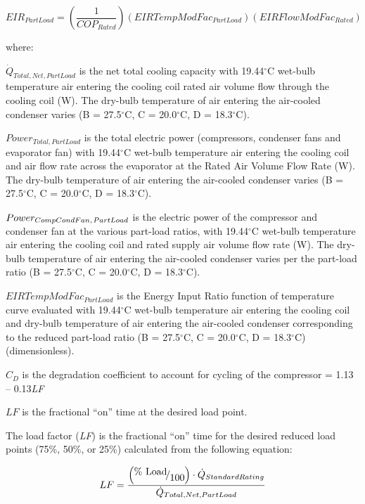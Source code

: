 \begin{equation}
EI{R_{PartLoad}} = \left( {\frac{1}{{CO{P_{Rated}}}}} \right)(EIRTempModFa{c_{PartLoad}})(EIRFlowModFa{c_{Rated}})
\end{equation}

where:

\({\dot Q_{Total,Net,PartLoad}}\) is the net total cooling capacity with 19.44\(^{\circ}\)C wet-bulb temperature air entering the cooling coil rated air volume flow through the cooling coil (W). The dry-bulb temperature of air entering the air-cooled condenser varies (B = 27.5\(^{\circ}\)C, C = 20.0\(^{\circ}\)C, D = 18.3\(^{\circ}\)C).

\(Powe{r_{Total,PartLoad}}\) is the total electric power (compressors, condenser fans and evaporator fan) with 19.44\(^{\circ}\)C wet-bulb temperature air entering the cooling coil and air flow rate across the evaporator at the Rated Air Volume Flow Rate (W). The dry-bulb temperature of air entering the air-cooled condenser varies (B = 27.5\(^{\circ}\)C, C = 20.0\(^{\circ}\)C, D = 18.3\(^{\circ}\)C).

\(Powe{r_{CompCondFan,{\kern 1pt} PartLoad}}\) is the electric power of the compressor and condenser fan at the various part-load ratios, with 19.44\(^{\circ}\)C wet-bulb temperature air entering the cooling coil and rated supply air volume flow rate (W). The dry-bulb temperature of air entering the air-cooled condenser varies per the part-load ratio (B = 27.5\(^{\circ}\)C, C = 20.0\(^{\circ}\)C, D = 18.3\(^{\circ}\)C).

\(EIRTempModFa{c_{PartLoad}}\) is the Energy Input Ratio function of temperature curve evaluated with 19.44\(^{\circ}\)C wet-bulb temperature air entering the cooling coil and dry-bulb temperature of air entering the air-cooled condenser corresponding to the reduced part-load ratio (B = 27.5\(^{\circ}\)C, C = 20.0\(^{\circ}\)C, D = 18.3\(^{\circ}\)C) (dimensionless).

\({C_D}\) is the degradation coefficient to account for cycling of the compressor = 1.13 -- 0.13\emph{LF}

\(LF\) is the fractional ``on'' time at the desired load point.

The load factor (\emph{LF}) is the fractional ``on'' time for the desired reduced load points (75\%, 50\%, or 25\%) calculated from the following equation:

\begin{equation}
LF = \frac{{\left( {{\raise0.7ex\hbox{{\% Load}} \!\mathord{\left/ {\vphantom {{\% Load} {100}}}\right.}\!\lower0.7ex\hbox{{100}}}} \right) \cdot {{\dot Q}_{StandardRating}}}}{{{{\dot Q}_{Total,Net,PartLoad}}}}
\end{equation}

